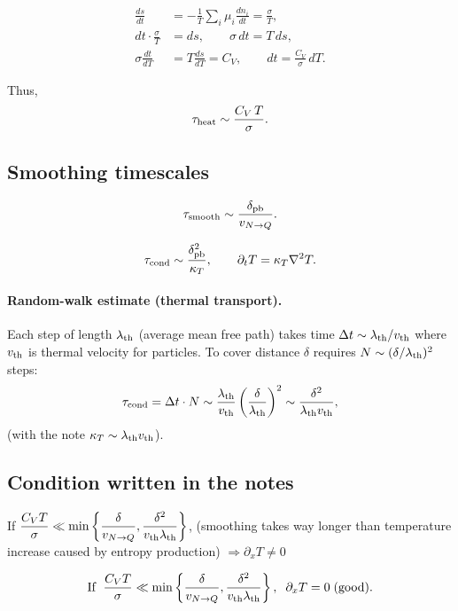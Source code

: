 \documentclass[11pt]{article}
\begin{document}
\begin{align}
\frac{ds}{dt}
&= -\frac{1}{T}\sum_i \mu_i \frac{d n_i}{dt}
= \frac{\sigma}{T},
\\
dt \cdot \frac{\sigma}{T} &= ds,
\qquad
\sigma\,dt = T\,ds,
\\
\sigma \frac{dt}{dT}
&= T \frac{ds}{dT}
= C_V,
\qquad
dt = \frac{C_V}{\sigma}\,dT.
\end{align}

Thus,
\begin{equation}
\tau_{\rm heat} \sim \frac{C_V\,T}{\sigma}.
\end{equation}

\subsection*{Smoothing timescales}

\begin{equation}
\tau_{\rm smooth} \sim \frac{\delta_{\rm pb}}{v_{N\to Q}}.
\end{equation}

\begin{equation}
\tau_{\rm cond} \sim \frac{\delta_{\rm pb}^2}{\kappa_T},
\qquad
\partial_t T = \kappa_T \nabla^2 T.
\end{equation}

\paragraph{Random-walk estimate (thermal transport).}
Each step of length $\lambda_{\rm th}$ (average mean free path) takes time $\Delta t\sim \lambda_{\rm th}/v_{\rm th}$ where $v_{\rm th}$ is thermal velocity for particles.
To cover distance $\delta$ requires $N\sim (\delta/\lambda_{\rm th})^2$ steps:
\begin{equation}
\tau_{\rm cond} = \Delta t \cdot N
\sim \frac{\lambda_{\rm th}}{v_{\rm th}}\left(\frac{\delta}{\lambda_{\rm th}}\right)^2
\sim \frac{\delta^2}{\lambda_{\rm th} v_{\rm th}},
\end{equation}
(with the note $\kappa_T \sim \lambda_{\rm th} v_{\rm th}$).

\subsection*{Condition written in the notes}

If $\displaystyle \frac{C_V T}{\sigma}
\ll
\min\left\{
\frac{\delta}{v_{N\to Q}},
\frac{\delta^2}{v_{\rm th}\lambda_{\rm th}}
\right\}$, (smoothing takes way longer than temperature increase caused by entropy production) $\Rightarrow \partial_x T \neq 0$

\begin{equation}
\text{If }\;
\frac{C_V T}{\sigma}
\ll
\min\left\{
\frac{\delta}{v_{N\to Q}},
\frac{\delta^2}{v_{\rm th}\lambda_{\rm th}}
\right\},
\;\;\partial_x T = 0 \;\text{(good).}
\end{equation}
\end{document}
